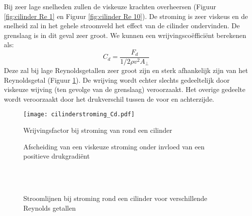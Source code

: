 Bij zeer lage snelheden zullen de viskeuze krachten overheersen (Figuur \ref{fig:cilinder Re 1} en Figuur \ref{fig:cilinder Re 10}). De stroming is zeer viskeus en de snelheid zal in het gehele stroomveld het effect van de cilinder ondervinden. De grenslaag is in dit geval zeer groot.
We kunnen een wrijvingscoëfficiënt berekenen als:
\begin{equation}
	C_d = \frac{F_d}{1/2 \rho v^2 A_{\perp}}
	\label{eqn:wrijvingscoefficient}
\end{equation}
Deze zal bij lage Reynoldsgetallen zeer groot zijn en sterk afhankelijk zijn van het Reynoldsgetal (Figuur \ref{fig:cilinderstroming_cd}). De wrijving wordt echter slechts gedeeltelijk door viskeuze wijving (ten gevolge van de grenslaag) veroorzaakt. Het overige gedeelte wordt veroorzaakt door het drukverschil tussen de voor en achterzijde.
\begin{figure}[htb]
	\centering
	\texttt{[image: cilinderstroming\_Cd.pdf]}
	\caption{Wrijvingsfactor bij stroming van rond een cilinder }
	\label{fig:cilinderstroming_cd}
\end{figure}
\begin{figure}[htb]
	\centering
	
	\caption{Afscheiding van een viskeuze stroming onder invloed van een positieve drukgradiënt}
	\label{fig:afscheiding}
\end{figure}
\begin{figure}[htb]
	\centering
	 \quad
	\\
	 \quad
	\\
	\caption{Stroomlijnen bij stroming rond een cilinder voor verschillende Reynolds getallen}
	\label{fig:Sroomlijnen bij stroming rond een cilinder}
\end{figure}

